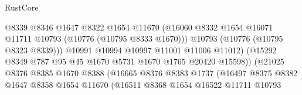 \begin{lexlean}{RustCore}
\begin{coremodule}
                                          @8339
                                          @8346
                                          @1647
                                          @8322
                                          @1654
                                          @11670
                                          (@16060
                                            @8332
                                            @1654
                                            @16071
                                            @11711
                                            @10793
                                            (@10776 (@10795 @8333 @1670)))
                                          @10793
                                          (@10776 (@10795 @8323 @8339)))
                                        @10991
                                        @10994
                                        @10997
                                        @11001
                                        @11006
                                        @11012)
                                      (@15292
                                        @8349
                                        @787
                                        @95
                                        @45
                                        @1670
                                        @5731
                                        @1670
                                        @1765
                                        @20420
                                        @15598))
                                    (@21025
                                      @8376
                                      @8385
                                      @1670
                                      @8388
                                      (@16665
                                        @8376
                                        @8383
                                        @1737
                                        (@16497
                                          @8375
                                          @8382
                                          @1647
                                          @8358
                                          @1654
                                          @11670
                                          (@16511
                                            @8368
                                            @1654
                                            @16522
                                            @11711
                                            @10793

\end{coremodule}
\end{lexlean}
